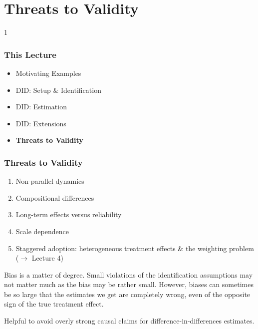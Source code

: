 \documentclass[xcolor=svgnames,9pt,english, aspectratio=169]{beamer}
\newcommand{\handout}{0}
\begin{document}
  
\section{Threats to Validity}

\if\handout1
\begin{frame}
  \frametitle{This Lecture}
\begin{itemize}\itemsep1em
\item Motivating Examples
\item DID: Setup \& Identification
\item DID: Estimation
\item DID: Extensions
\item \textbf{Threats to Validity}
\end{itemize}
\end{frame}
\fi


\begin{frame}
  \frametitle{Threats to Validity}

\begin{enumerate}[<+->]\itemsep0.5em
\item Non-parallel dynamics
\item Compositional differences
\item Long-term effects versus reliability
\item Scale dependence
\item Staggered adoption: heterogeneous treatment effects \& the weighting problem ($\rightarrow$ Lecture 4)
\end{enumerate}\bigskip\pause
Bias is a matter of degree. Small violations of the identification assumptions may not matter much as the bias may be rather small. However, biases can sometimes be so large that the estimates we get are completely wrong, even of the opposite sign of the true treatment effect.\\\bigskip\pause

Helpful to avoid overly strong causal claims for difference-in-differences estimates.
\end{frame}
\end{document}
